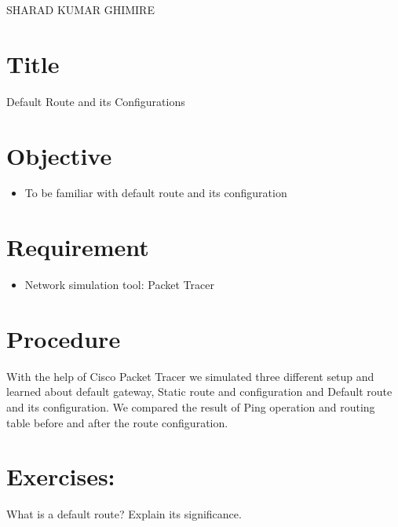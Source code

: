 \documentclass[a4paper,11pt]{article}
\begin{document}
{SHARAD KUMAR GHIMIRE}

\renewcommand{\contentsname}{Table of Contents}
\tableofcontents

\pagebreak
\listoftables
\pagebreak
\lstlistoflistings
\pagebreak
\listoffigures
\pagebreak
{}

\section{Title} {\large Default Route and its Configurations}
\section{Objective}
\begin{itemize}
    \item To be familiar with default route and its configuration

\end{itemize}
\section{Requirement}
\begin{itemize}
    \item Network simulation tool: Packet Tracer
\end{itemize}

\section{Procedure}
With the help of Cisco Packet Tracer  we simulated three different setup and learned about default gateway, Static route and configuration and Default route and its configuration.
We compared the result of Ping operation and routing table before and after the  route configuration.


\pagebreak
\section{Exercises:}

\begin{Q}
    {
        What is a default route? Explain its significance.
    }
\end{Q}
\end{document}
